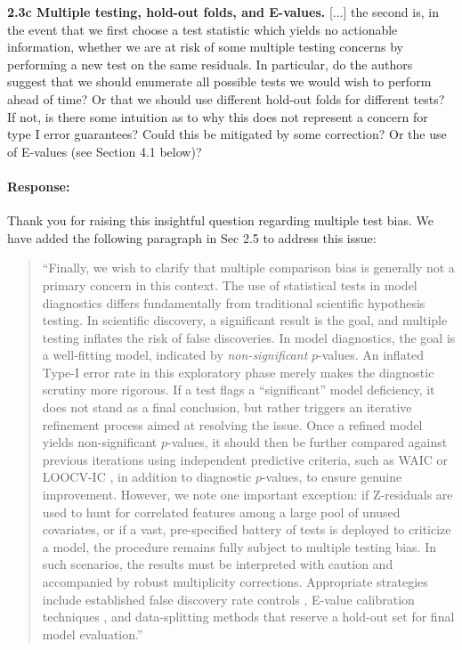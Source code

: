 \documentclass[11pt]{article}
\newcommand*{\mybox}[2]{%
  \par\medskip\noindent
  \colorbox{#1!30}{\parbox{.98\linewidth}{#2}}%
  \par\medskip
}
\begin{document}

\mybox{gray}{\textbf{2.3c Multiple testing, hold-out folds, and E-values.} [...] the second is, in the event that we first choose a test statistic which yields no actionable information, whether we are at risk of some multiple testing concerns by performing a new test on the same residuals. In particular, do the authors suggest that we should enumerate all possible tests we would wish to perform ahead of time? Or that we should use different hold-out folds for different tests? If not, is there some intuition as to why this does not represent a concern for type I error guarantees? Could this be mitigated by some correction? Or the use of E-values (see Section 4.1 below)?}

\paragraph{Response:}

Thank you for raising this insightful question regarding multiple test bias. We have added the following paragraph in Sec 2.5 to address this issue:

\begin{quote}
``Finally, we wish to clarify that multiple comparison bias is generally not a primary concern in this context. The use of statistical tests in model diagnostics differs fundamentally from traditional scientific hypothesis testing. In scientific discovery, a significant result is the goal, and multiple testing inflates the risk of false discoveries. In model diagnostics, the goal is a well-fitting model, indicated by \textit{non-significant} $p$-values. An inflated Type-I error rate in this exploratory phase merely makes the diagnostic scrutiny more rigorous. If a test flags a ``significant'' model deficiency, it does not stand as a final conclusion, but rather triggers an iterative refinement process aimed at resolving the issue. Once a refined model yields non-significant $p$-values, it should then be further compared against previous iterations using independent predictive criteria, such as WAIC or LOOCV-IC \citep{Vehtari2017}, in addition to diagnostic $p$-values, to ensure genuine improvement. However, we note one important exception: if Z-residuals are used to hunt for correlated features among a large pool of unused covariates, or if a vast, pre-specified battery of tests is deployed to criticize a model, the procedure remains fully subject to multiple testing bias. In such scenarios, the results must be interpreted with caution and accompanied by robust multiplicity corrections. Appropriate strategies include established false discovery rate controls \citep{Benjamini1995}, E-value calibration techniques \citep{VovkVladimir2021ECCA, RamdasAaditya2023GSaS}, and data-splitting methods that reserve a hold-out set for final model evaluation.''
\end{quote}
\end{document}
